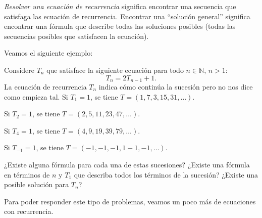 \textit{Resolver una ecuación de recurrencia} significa encontrar una secuencia que satisfaga las ecuación de recurrencia. Encontrar una ``solución general'' significa encontrar una fórmula que describe todas las soluciones posibles (todas las secuencias posibles que satisfacen la ecuación).

Veamos el siguiente ejemplo:

Considere $T_{n}$ que satisface la siguiente ecuación para todo $n\in\mathds{N}$, $n>1$:
\begin{equation*}
T_{n}=2T_{n-1}+1.
\end{equation*}
La ecuación de recurrencia $T_{n}$ indica cómo continúa la sucesión pero no nos dice como empieza tal.
Si $T_{1}=1$, se tiene $T=\left(1,7,3,15,31,\ldots\right)$.

Si $T_{2}=1$, se tiene $T=\left(2,5,11,23,47,\ldots\right)$.

Si $T_{4}=1$, se tiene $T=\left(4,9,19,39,79,\ldots\right)$.

Si $T_{-1}=1$, se tiene $T=\left(-1,-1,-1,1-1,-1,\ldots\right)$.

¿Existe alguna fórmula para cada una de estas sucesiones? ¿Existe una fórmula en términos de $n$ y $T_{1}$ que describa todos los términos de la sucesión? ¿Existe una posible solución para $T_{n}$?

Para poder responder este tipo de problemas, veamos un poco más de ecuaciones con recurrencia.


